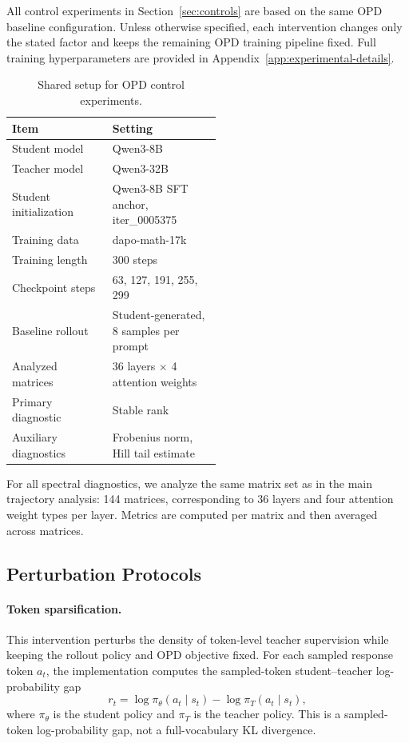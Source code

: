\documentclass{llmxive}
\begin{document}
All control experiments in Section~\ref{sec:controls} are based on the
same OPD baseline configuration. Unless otherwise specified, each
intervention changes only the stated factor and keeps the remaining OPD
training pipeline fixed. Full training hyperparameters are provided in
Appendix~\ref{app:experimental-details}.
\begin{table}[t]
\centering
\setlength{\tabcolsep}{4pt}
\begin{tabular}{@{}lp{0.52\linewidth}@{}}
\toprule
Item & Setting \\
\midrule
Student model & Qwen3-8B \\
Teacher model & Qwen3-32B \\
Student initialization & Qwen3-8B SFT anchor, iter\_0005375 \\
Training data & dapo-math-17k \\
Training length & 300 steps \\
Checkpoint steps & 63, 127, 191, 255, 299 \\
Baseline rollout & Student-generated, 8 samples per prompt \\
Analyzed matrices & 36 layers $\times$ 4 attention weights \\
Primary diagnostic & Stable rank \\
Auxiliary diagnostics & Frobenius norm, Hill tail estimate \\
\bottomrule
\end{tabular}
\caption{Shared setup for OPD control experiments.}
\label{tab:control-shared-setup}
\end{table}

For all spectral diagnostics, we analyze the same matrix set as in the main
trajectory analysis: 144 matrices, corresponding to 36 layers and four
attention weight types per layer. Metrics are computed per matrix and then
averaged across matrices.

\subsection{Perturbation Protocols}
\label{app:control-protocols}
\paragraph{Token sparsification.}
This intervention perturbs the density of token-level teacher supervision
while keeping the rollout policy and OPD objective fixed. For each sampled
response token $a_t$, the implementation computes the sampled-token
student--teacher log-probability gap
\[
    r_t
    =
    \log \pi_\theta(a_t\mid s_t)
    -
    \log \pi_T(a_t\mid s_t),
\]
where $\pi_\theta$ is the student policy and $\pi_T$ is the teacher policy.
This is a sampled-token log-probability gap, not a full-vocabulary KL
divergence.
\end{document}

